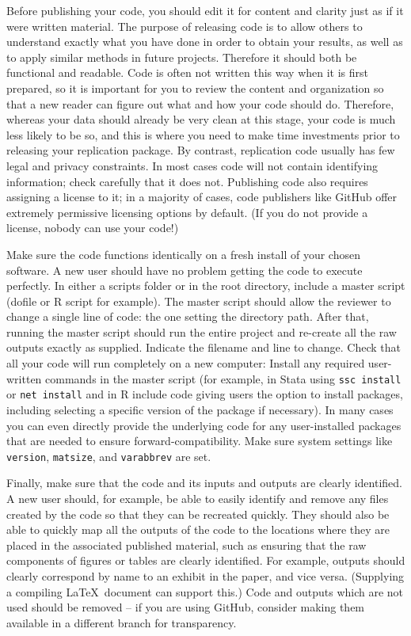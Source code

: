 Before publishing your code, you should edit it for content and clarity
just as if it were written material.
The purpose of releasing code is to allow others to understand
exactly what you have done in order to obtain your results,
as well as to apply similar methods in future projects.
Therefore it should both be functional and readable.
Code is often not written this way when it is first prepared,
so it is important for you to review the content and organization
so that a new reader can figure out what and how your code should do.
Therefore, whereas your data should already be very clean at this stage,
your code is much less likely to be so, and this is where you need to make
time investments prior to releasing your replication package.
By contrast, replication code usually has few legal and privacy constraints.
In most cases code will not contain identifying information;
check carefully that it does not.
Publishing code also requires assigning a license to it;
in a majority of cases, code publishers like GitHub
offer extremely permissive licensing options by default.
(If you do not provide a license, nobody can use your code!)

Make sure the code functions identically on a fresh install of your chosen software.
A new user should have no problem getting the code to execute perfectly.
In either a scripts folder or in the root directory,
include a master script (dofile or R script for example).
The master script should allow the reviewer
to change a single line of code: the one setting the directory path.
After that, running the master script should run the entire project
and re-create all the raw outputs exactly as supplied.
Indicate the filename and line to change.
Check that all your code will run completely on a new computer:
Install any required user-written commands in the master script
(for example, in Stata using \texttt{ssc install} or \texttt{net install}
and in R include code giving users the option to install packages,
including selecting a specific version of the package if necessary).
In many cases you can even directly provide the underlying code
for any user-installed packages that are needed to ensure forward-compatibility.
Make sure system settings like \texttt{version}, \texttt{matsize}, and \texttt{varabbrev} are set.

Finally, make sure that the code and its inputs and outputs are clearly identified.
A new user should, for example, be able to easily identify and remove
any files created by the code so that they can be recreated quickly.
They should also be able to quickly map all the outputs of the code
to the locations where they are placed in the associated published material,
such as ensuring that the raw components of figures or tables are clearly identified.
For example, outputs should clearly correspond by name to an exhibit in the paper, and vice versa.
(Supplying a compiling \LaTeX\ document can support this.)
Code and outputs which are not used should be removed --
if you are using GitHub, consider making them available in a different branch for transparency.

